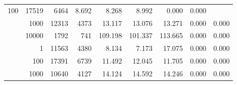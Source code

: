 \begin{table}
\begin{tabular}{rrrrrrrrr}
					\multirow{ 1 }{*}{ 100 } &
					
						
							    
							     17519  & 6464  
	                           & 8.692 & 8.268 & 8.992
	                           & 0.000 & 0.000  \\
	                
	            
					 &  
					 
					\multirow{ 1 }{*}{ 1000 } &
					
						
							    
							     12313  & 4373  
	                           & 13.117 & 13.076 & 13.271
	                           & 0.000 & 0.000  \\
	                
	            
					 &  
					 
					\multirow{ 1 }{*}{ 10000 } &
					
						
							    
							     1792  & 741  
	                           & 109.198 & 101.337 & 113.665
	                           & 0.000 & 0.000  \\
	                
	            
	        
				\noalign{\smallskip}\hline
				\multirow{ 4 }{*}{ 250000 } &
				
					
					 
					\multirow{ 1 }{*}{ 1 } &
					
						
							    
							     11563  & 4380  
	                           & 8.134 & 7.173 & 17.075
	                           & 0.000 & 0.000  \\
	                
	            
					 &  
					 
					\multirow{ 1 }{*}{ 100 } &
					
						
							    
							     17391  & 6739  
	                           & 11.492 & 12.045 & 11.705
	                           & 0.000 & 0.000  \\
	                
	            
					 &  
					 
					\multirow{ 1 }{*}{ 1000 } &
					
						
							    
							     10640  & 4127  
	                           & 14.124 & 14.592 & 14.246
	                           & 0.000 & 0.000  \\
	                

\end{tabular}
\end{table}
